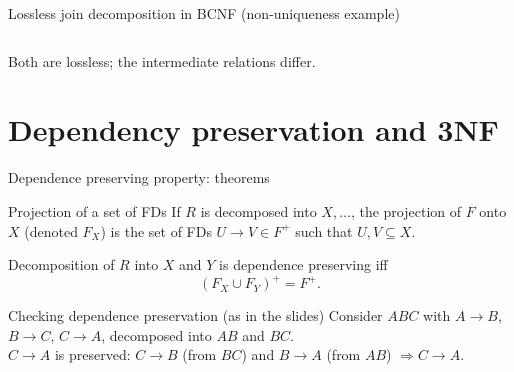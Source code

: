 \documentclass[10pt,aspectratio=169]{beamer}
\newenvironment{examplebox}[1][Example]{\begin{exampleblock}{#1}}{\end{exampleblock}}
\begin{document}
\begin{frame}{Lossless join decomposition in BCNF (non-uniqueness example)}
\begin{columns}[T,onlytextwidth]
\end{columns}

\vspace{0.2em}
\scriptsize Both are lossless; the intermediate relations differ.
\end{frame}

\section{Dependency preservation and 3NF}

\begin{frame}{Dependence preserving property: theorems}
\begin{block}{Projection of a set of FDs}
If \(R\) is decomposed into \(X,\dots\), the projection of \(F\) onto \(X\) (denoted \(F_X\)) is the set of FDs \(U\rightarrow V\in F^+\) such that \(U,V\subseteq X\).
\end{block}

\begin{theorem}
Decomposition of \(R\) into \(X\) and \(Y\) is dependence preserving iff
\[
(F_X \cup F_Y)^+ = F^+.
\]
\end{theorem}

\begin{examplebox}[Checking dependence preservation (as in the slides)]
Consider \(ABC\) with \(A\rightarrow B\), \(B\rightarrow C\), \(C\rightarrow A\), decomposed into \(AB\) and \(BC\).\\
\(C\rightarrow A\) is preserved: \(C\rightarrow B\) (from \(BC\)) and \(B\rightarrow A\) (from \(AB\)) \(\Rightarrow C\rightarrow A\).
\end{examplebox}
\end{frame}
\end{document}
